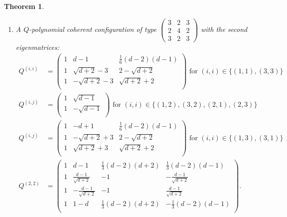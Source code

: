 \documentclass[11pt]{article}
\newtheorem{theorem}{Theorem}[section]
\theoremstyle{definition}
\theoremstyle{remark}
\begin{document}
\begin{theorem}
\begin{enumerate}
\item[{\rm (iii)}] A $Q$-polynomial coherent configuration of type $\begin{pmatrix} 
3 & 2 & 3 \\ 
2 & 4 & 2 \\ 
3 & 2 & 3 
\end{pmatrix}$ with the second eigenmatrices:  
\begin{align*}
Q^{(i,i)}&=\left(
\begin{array}{ccc}
1 & d-1 & \frac{1}{6} (d-2) (d-1) \\
1 & \sqrt{d+2}-3 & 2-\sqrt{d+2} \\
1 & -\sqrt{d+2}-3 & \sqrt{d+2}+2 \\
\end{array}
\right) \text{ for }(i,i)\in\{(1,1),(3,3)\}\\
Q^{(i,j)}&=\left(
\begin{array}{ccc}
1 & \sqrt{d-1}  \\
1 & -\sqrt{d-1}  \\
\end{array}
\right) \text{ for }(i,i)\in\{(1,2),(3,2),(2,1),(2,3)\}\\
Q^{(i,j)}&=\left(
\begin{array}{ccc}
1 & -d+1 & \frac{1}{6} (d-2) (d-1) \\
1 & -\sqrt{d+2}+3 & 2-\sqrt{d+2} \\
1 & \sqrt{d+2}+3 & \sqrt{d+2}+2 \\
\end{array}
\right) \text{ for }(i,i)\in\{(1,3),(3,1)\}\\
Q^{(2,2)}&=\left(
\begin{array}{cccc}
1 & d-1 & \frac{1}{3} (d-2) (d+2) & \frac{1}{3} (d-2) (d-1) \\
1 & \frac{d-1}{\sqrt{d+2}} & -1 & -\frac{d-1}{\sqrt{d+2}} \\
1 & -\frac{d-1}{\sqrt{d+2}} & -1 & \frac{d-1}{\sqrt{d+2}} \\
1 & 1-d & \frac{1}{3} (d-2) (d+2) & -\frac{1}{3} (d-2) (d-1) \\
\end{array}
\right).
\end{align*}

\end{enumerate}
\end{theorem}
\end{document}
